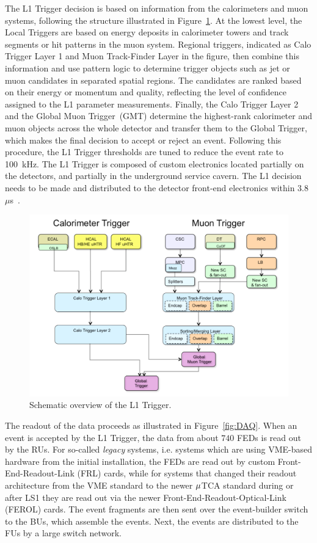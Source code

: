 The \ac{L1} Trigger decision is based on information from the calorimeters and muon systems, following the structure illustrated in Figure~\ref{fig:L1}. At the lowest level, the Local Triggers are based on energy deposits in calorimeter towers and track segments or hit patterns in the muon system. Regional triggers, indicated as Calo Trigger Layer 1 and Muon Track-Finder Layer in the figure, then combine this information and use pattern logic to determine trigger objects such as jet or muon candidates in separated spatial regions. The candidates are ranked based on their energy or momentum and quality, reflecting the level of confidence assigned to the \ac{L1} parameter measurements. Finally, the Calo Trigger Layer 2 and the Global Muon Trigger~(GMT) determine the highest-rank calorimeter and muon objects across the whole detector and transfer them to the Global Trigger, which makes the final decision to accept or reject an event. Following this procedure, the \ac{L1} Trigger thresholds are tuned to reduce the event rate to 100~kHz. The \ac{L1} Trigger is composed of custom electronics located partially on the detectors, and partially in the underground service cavern. The \ac{L1} decision needs to be made and distributed to the detector front-end electronics within 3.8~$\mu$s~\cite{Tapper:2013yva}.

\begin{figure}[ht]
  \centering
 \includegraphics[width=.9\textwidth]{trigger}
 \caption{Schematic overview of the \ac{L1} Trigger.~\cite{Tapper:2013yva}}
 \label{fig:L1}
\end{figure}
 
The readout of the data proceeds as illustrated in Figure~\ref{fig:DAQ}. When an event is accepted by the \ac{L1} Trigger, the data from about $740$ \acp{FED} is read out by the \acp{RU}. For so-called {\it legacy} systems, i.e. systems which are using VME-based hardware from the initial installation, the \acp{FED} are read out by custom Front-End-Readout-Link (FRL) cards, while for systems that changed their readout architecture from the VME standard to the newer $\rm \mu{}$TCA standard during or after LS1 they are read out via the newer Front-End-Readout-Optical-Link (FEROL) cards. The event fragments are then sent over the event-builder switch to the \acp{BU}, which assemble the events. Next, the events are distributed to the \acp{FU} by a large switch network.

